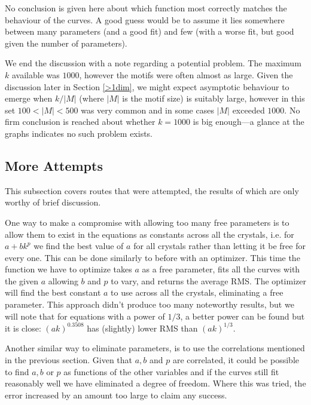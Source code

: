\documentclass[11pt]{article}
\theoremstyle{definition}
\begin{document}
No conclusion is given here about which function most correctly matches the behaviour of the curves. A good guess would be to assume it lies somewhere between many parameters (and a good fit) and few (with a worse fit, but good given the number of parameters).

We end the discussion with a note regarding a potential problem. The maximum $k$ available was $1000$, however the motifs were often almost as large. Given the discussion later in Section \ref{>1dim}, we might expect asymptotic behaviour to emerge when $k/|M|$ (where $|M|$ is the motif size) is suitably large, however in this set $100<|M|<500$ was very common and in some cases $|M|$ exceeded $1000$. No firm conclusion is reached about whether $k=1000$ is big enough---a glance at the graphs indicates no such problem exists.

\subsection{More Attempts}\label{more-attempts}

This subsection covers routes that were attempted, the results of which are only worthy of brief discussion. 

One way to make a compromise with allowing too many free parameters is to allow them to exist in the equations as constants across all the crystals, i.e. for $a+bk^p$ we find the best value of $a$ for all crystals rather than letting it be free for every one. This can be done similarly to before with an optimizer. This time the function we have to optimize takes $a$ as a free parameter, fits all the curves with the given $a$ allowing $b$ and $p$ to vary, and returns the average RMS. The optimizer will find the best constant $a$ to use across all the crystals, eliminating a free parameter. This approach didn't produce too many noteworthy results, but we will note that for equations with a power of $1/3$, a better power can be found but it is close: $(ak)^{0.3508}$ has (slightly) lower RMS than $(ak)^{1/3}$.

\null

Another similar way to eliminate parameters, is to use the correlations mentioned in the previous section. Given that $a,b$ and $p$ are correlated, it could be possible to find $a,b$ or $p$ as functions of the other variables and if the curves still fit reasonably well we have eliminated a degree of freedom. Where this was tried, the error increased by an amount too large to claim any success.
\end{document}
